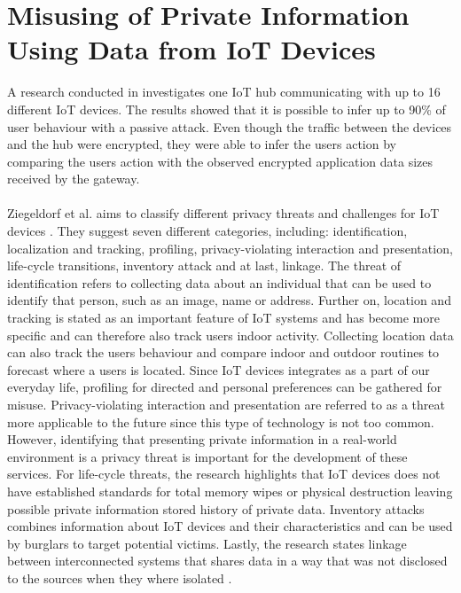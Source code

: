 \section{Misusing of Private Information Using Data from IoT Devices}
A research conducted in \cite{PassiveInferenceIoT} investigates one IoT hub communicating with up to 16 different IoT devices. The results showed that it is possible to infer up to 90\% of user behaviour with a passive attack. Even though the traffic between the devices and the hub were encrypted, they were able to infer the users action by comparing the users action with the observed encrypted application data sizes received by the gateway. 
\\\\
Ziegeldorf et al. aims to classify different privacy threats and challenges for IoT devices \cite{IoTPrivacyAndMisuse}. They suggest seven different categories, including: identification, localization and tracking, profiling, privacy-violating interaction and presentation, life-cycle transitions, inventory attack and at last, linkage. The threat of identification refers to collecting data about an individual that can be used to identify that person, such as an image, name or address. Further on, location and tracking is stated as an important feature of IoT systems and has become more specific and can therefore also track users indoor activity. Collecting location data can also track the users behaviour and compare indoor and outdoor routines to forecast where a users is located. Since IoT devices integrates as a part of our everyday life, profiling for directed and personal preferences can be gathered for misuse. Privacy-violating interaction and presentation are referred to as a threat more applicable to the future since this type of technology is not too common. However, identifying that presenting private information in a real-world environment is a privacy threat is important for the development of these services. For life-cycle threats, the research highlights that IoT devices does not have established standards for total memory wipes or physical destruction leaving possible private information stored history of private data. Inventory attacks combines information about IoT devices and their characteristics and can be used by burglars to target potential victims. Lastly, the research states linkage between interconnected systems that shares data in a way that was not disclosed to the sources when they where isolated \cite{IoTPrivacyAndMisuse}. 
\\\\
